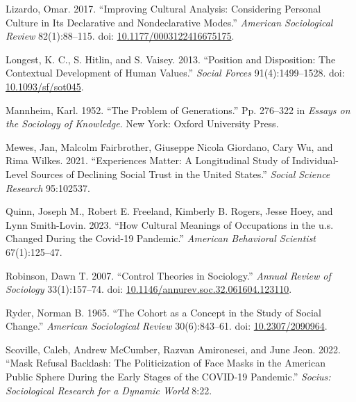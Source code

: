 \documentclass[
  12pt,
]{article}
\newlength{\cslhangindent}
\newlength{\cslentryspacingunit} %
\newenvironment{CSLReferences}[2] %
 {%
  \setlength{\parindent}{0pt}
  \ifodd #1
  \let\oldpar\par
  \def\par{\hangindent=\cslhangindent\oldpar}
  \fi
  \setlength{\parskip}{#2\cslentryspacingunit}
 }%
 {}
\begin{document}
\begin{CSLReferences}{1}{0}
\leavevmode{}%
Lizardo, Omar. 2017. {``Improving {Cultural} {Analysis}: {Considering}
{Personal} {Culture} in Its {Declarative} and {Nondeclarative}
{Modes}.''} \emph{American Sociological Review} 82(1):88--115. doi:
\href{https://doi.org/10.1177/0003122416675175}{10.1177/0003122416675175}.

\leavevmode{}%
Longest, K. C., S. Hitlin, and S. Vaisey. 2013. {``Position and
{Disposition}: {The} {Contextual} {Development} of {Human} {Values}.''}
\emph{Social Forces} 91(4):1499--1528. doi:
\href{https://doi.org/10.1093/sf/sot045}{10.1093/sf/sot045}.

\leavevmode{}%
Mannheim, Karl. 1952. {``The {Problem} of {Generations}.''} Pp. 276--322
in \emph{Essays on the {Sociology} of {Knowledge}}. New York: Oxford
University Press.

\leavevmode{}%
Mewes, Jan, Malcolm Fairbrother, Giuseppe Nicola Giordano, Cary Wu, and
Rima Wilkes. 2021. {``Experiences Matter: A Longitudinal Study of
Individual-Level Sources of Declining Social Trust in the United
States.''} \emph{Social Science Research} 95:102537.

\leavevmode{}%
Quinn, Joseph M., Robert E. Freeland, Kimberly B. Rogers, Jesse Hoey,
and Lynn Smith-Lovin. 2023. {``How Cultural Meanings of Occupations in
the u.s. Changed During the Covid-19 Pandemic.''} \emph{American
Behavioral Scientist} 67(1):125--47.

\leavevmode{}%
Robinson, Dawn T. 2007. {``Control {Theories} in {Sociology}.''}
\emph{Annual Review of Sociology} 33(1):157--74. doi:
\href{https://doi.org/10.1146/annurev.soc.32.061604.123110}{10.1146/annurev.soc.32.061604.123110}.

\leavevmode{}%
Ryder, Norman B. 1965. {``The {Cohort} as a {Concept} in the {Study} of
{Social} {Change}.''} \emph{American Sociological Review} 30(6):843--61.
doi: \href{https://doi.org/10.2307/2090964}{10.2307/2090964}.

\leavevmode{}%
Scoville, Caleb, Andrew McCumber, Razvan Amironesei, and June Jeon.
2022. {``Mask {Refusal} {Backlash}: {The} {Politicization} of {Face}
{Masks} in the {American} {Public} {Sphere} During the {Early} {Stages}
of the {COVID}-19 {Pandemic}.''} \emph{Socius: Sociological Research for
a Dynamic World} 8:22.


\end{CSLReferences}
\end{document}
